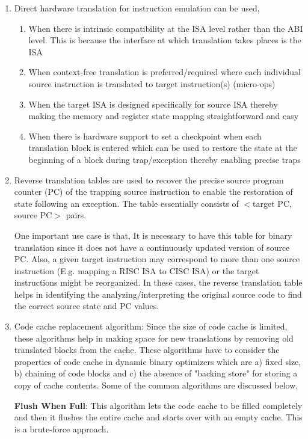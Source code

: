 \documentclass[11pt,a4paper,oneside]{article}
\begin{document}
\begin{enumerate}
		\item Direct hardware translation for instruction emulation can be used,
			\begin{enumerate}
				\item When there is intrinsic compatibility at the ISA level rather than the ABI level. This is because the interface at which translation takes places is the ISA
				\item When context-free translation is preferred/required where each individual source instruction is translated to target instruction(s) (micro-ops)
				\item When the target ISA is designed specifically for source ISA thereby making the memory and register state mapping straightforward and easy
				\item When there is hardware support to set a checkpoint when each translation block is entered which can be used to restore the state at the beginning of a block during trap/exception thereby enabling precise traps
			\end{enumerate}
		
		\item Reverse translation tables are used to recover the precise source program counter (PC) of the trapping source instruction to enable the restoration of state following an exception. The table essentially consists of $<$target PC, source PC$>$ pairs.
		
		One important use case is that, It is necessary to have this table for binary translation since it does not have a continuously updated version of source PC. Also, a given target instruction may correspond to more than one source instruction (E.g. mapping a RISC ISA to CISC ISA) or the target instructions might be reorganized. In these cases, the reverse translation table helps in identifying the analyzing/interpreting the original source code to find the correct source state and PC values.
		
		\item Code cache replacement algorithm: Since the size of code cache is limited, these algorithms help in making space for new translations by removing old translated blocks from the cache. These algorithms have to consider the properties of code cache in dynamic binary optimizers which are a) fixed size, b) chaining of code blocks and c) the absence of "backing store" for storing a copy of cache contents. Some of the common algorithms are discussed below,
		
		\textbf{Flush When Full}: This algorithm lets the code cache to be filled completely and then it flushes the entire cache and starts over with an empty cache. This is a brute-force approach.
		

\end{enumerate}
\end{document}
